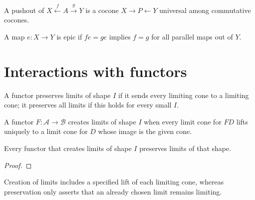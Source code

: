 \begin{definition}[Pushout]
\label{def:lbc-pushout}
A pushout of $X\xleftarrow f A\xrightarrow gY$ is a cocone
$X\to P\leftarrow Y$ universal among commutative cocones.
\end{definition}

\begin{definition}[Epimorphism]
\label{def:lbc-epic}
A map $e:X\to Y$ is epic if $fe=ge$ implies $f=g$ for all parallel maps out of
$Y$.
\end{definition}

\section{Interactions with functors}
\begin{definition}
\label{def:lbc-preserves-limits}
A functor preserves limits of shape $I$ if it sends every limiting cone to a
limiting cone; it preserves all limits if this holds for every small $I$.
\end{definition}

\begin{definition}
\label{def:lbc-creates-limits}
A functor $F:\mathcal A\to\mathcal B$ creates limits of shape $I$ when every
limit cone for $FD$ lifts uniquely to a limit cone for $D$ whose image is the
given cone.
\end{definition}

\begin{lemma}
\label{lem:lbc-creates-preserves}
Every functor that creates limits of shape $I$ preserves limits of that shape.
\notready
\end{lemma}
\begin{proof}
\notready
\end{proof}

\begin{remark}
\label{rem:lbc-creation}
Creation of limits includes a specified lift of each limiting cone, whereas
preservation only asserts that an already chosen limit remains limiting.
\end{remark}
